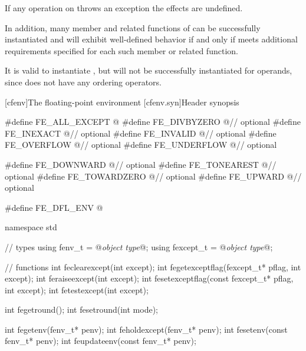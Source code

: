 \pnum
If any operation on 
throws an exception the effects are undefined.

\pnum
In addition, many member and related functions of
can be successfully instantiated
and will exhibit well-defined behavior if and only if
 meets additional requirements specified for each such member
or related function.

\pnum
\begin{example}
It is valid to instantiate
,
but
will not be successfully instantiated for
operands, since
does not have any ordering operators.
\end{example}

[cfenv]{The floating-point environment}
[cfenv.syn]{Header  synopsis}

%
%
%
%
%
%
%
%
%
%
%
%
%
%
%
%
%
%
%
%
%
%
%
%
%
\begin{codeblock}
#define FE_ALL_EXCEPT @\seebelow@
#define FE_DIVBYZERO @\seebelow@    // optional
#define FE_INEXACT @\seebelow@      // optional
#define FE_INVALID @\seebelow@      // optional
#define FE_OVERFLOW @\seebelow@     // optional
#define FE_UNDERFLOW @\seebelow@    // optional

#define FE_DOWNWARD @\seebelow@     // optional
#define FE_TONEAREST @\seebelow@    // optional
#define FE_TOWARDZERO @\seebelow@   // optional
#define FE_UPWARD @\seebelow@       // optional

#define FE_DFL_ENV @\seebelow@

namespace std {
  // types
  using fenv_t    = @\textit{object type}@;
  using fexcept_t = @\textit{object type}@;

  // functions
  int feclearexcept(int except);
  int fegetexceptflag(fexcept_t* pflag, int except);
  int feraiseexcept(int except);
  int fesetexceptflag(const fexcept_t* pflag, int except);
  int fetestexcept(int except);

  int fegetround();
  int fesetround(int mode);

  int fegetenv(fenv_t* penv);
  int feholdexcept(fenv_t* penv);
  int fesetenv(const fenv_t* penv);
  int feupdateenv(const fenv_t* penv);
}
\end{codeblock}

